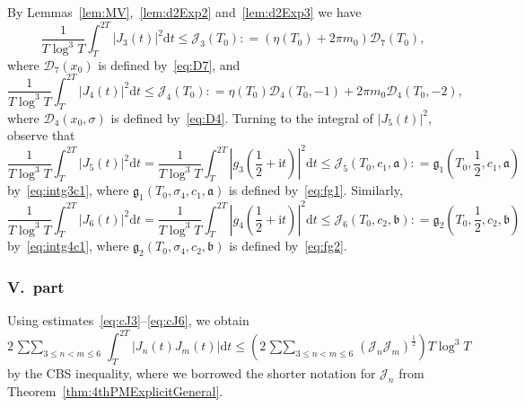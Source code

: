 \documentclass[a4paper,reqno]{amsart}
\theoremstyle{definition}
\newcommand{\de}[0]{\mathrel{\mathop:}=}
\newcommand{\ie}[0]{\mathrm{i}}
\newcommand{\dif}[1]{\mathrm{d}#1}
\begin{document}
By Lemmas~\ref{lem:MV},~\ref{lem:d2Exp2} and~\ref{lem:d2Exp3} we have
\begin{equation}
\label{eq:cJ3}
\frac{1}{T\log^{3}{T}}\int_{T}^{2T}\left|J_3(t)\right|^{2}\dif{t} \leq \mathcal{J}_{3}(T_0) \de \left(\eta(T_0)+2\pi m_0\right)\mathcal{D}_{7}(T_0),
\end{equation}
where $\mathcal{D}_7(x_0)$ is defined by~\eqref{eq:D7}, and
\begin{equation}
\label{eq:cJ4}
\frac{1}{T\log^{3}{T}}\int_{T}^{2T}\left|J_4(t)\right|^{2}\dif{t} \leq \mathcal{J}_{4}(T_0) \de \eta(T_0)\mathcal{D}_{4}(T_0,-1)+2\pi m_0\mathcal{D}_{4}(T_0,-2),
\end{equation}
where $\mathcal{D}_{4}(x_0,\sigma)$ is defined by~\eqref{eq:D4}. Turning to the integral of $|J_5(t)|^2$, observe that
\begin{equation}
\label{eq:cJ5}    
\frac{1}{T\log^{3}{T}}\int_{T}^{2T}\left|J_5(t)\right|^{2}\dif{t} = \frac{1}{T\log^{3}{T}}\int_{T}^{2T}\left|g_3\left(\frac{1}{2}+\ie t\right)\right|^{2}\dif{t} \leq \mathcal{J}_{5}\left(T_0,c_1,\bm{\mathfrak{a}}\right)\de \mathfrak{g}_1\left(T_0,\frac{1}{2},c_1,\bm{\mathfrak{a}}\right)
\end{equation}
by~\eqref{eq:intg3c1}, where $\mathfrak{g}_1\left(T_0,\sigma_4,c_1,\bm{\mathfrak{a}}\right)$ is defined by~\eqref{eq:fg1}. Similarly,
\begin{equation}
\label{eq:cJ6}
\frac{1}{T\log^{3}{T}}\int_{T}^{2T}|J_6(t)|^{2}\dif{t} = \frac{1}{T\log^{3}{T}}\int_{T}^{2T}\left|g_4\left(\frac{1}{2}+\ie t\right)\right|^{2}\dif{t} \leq \mathcal{J}_{6}\left(T_0,c_2,\bm{\mathfrak{b}}\right)\de \mathfrak{g}_{2}\left(T_0,\frac{1}{2},c_2,\bm{\mathfrak{b}}\right)
\end{equation}
by~\eqref{eq:intg4c1}, where $\mathfrak{g}_{2}\left(T_0,\sigma_4,c_2,\bm{\mathfrak{b}}\right)$ is defined by~\eqref{eq:fg2}.

\subsubsection{V.~part}
\label{sec:Vpart}

Using estimates~\eqref{eq:cJ3}--\eqref{eq:cJ6}, we obtain
\begin{equation}
\label{eq:cJMixed}
2\mathop{\sum\sum}_{3\leq n<m\leq 6}\int_{T}^{2T}\left|J_{n}(t)J_{m}(t)\right|\dif{t} \leq \left(2\mathop{\sum\sum}_{3\leq n<m\leq 6}\left(\mathcal{J}_{n}\mathcal{J}_m\right)^{\frac{1}{2}}\right)T\log^{3}{T}
\end{equation}
by the CBS inequality, where we borrowed the shorter notation for $\mathcal{J}_n$ from Theorem~\ref{thm:4thPMExplicitGeneral}.
\end{document}
